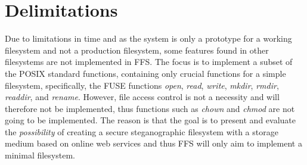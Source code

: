 \section{Delimitations} %
\label{sec:delim}

Due to limitations in time and as the system is only a prototype for a working filesystem and not a production filesystem, some features found in other filesystems are not implemented in \gls{FFS}. The focus is to implement a subset of the POSIX standard functions, containing only crucial functions for a simple filesystem, specifically, the \gls{FUSE} functions \textit{open}, \textit{read}, \textit{write}, \textit{mkdir}, \textit{rmdir}, \textit{readdir}, and \textit{rename}. However, file access control is not a necessity and will therefore not be implemented, thus functions such as \textit{chown} and \textit{chmod} are not going to be implemented. The reason is that the goal is to present and evaluate the \textit{possibility} of creating a secure steganographic filesystem with a storage medium based on online web services and thus \gls{FFS} will only aim to implement a minimal filesystem.